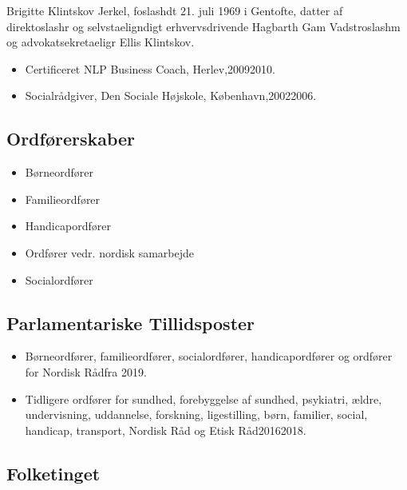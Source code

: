 \documentclass[11pt, a4paper]{awesome-cv}
\begin{document}
\makecvheader[R]
\makelettertitle
\begin{cvletter}
Brigitte Klintskov Jerkel, foslashdt 21. juli 1969 i Gentofte, datter af direktoslashr og selvstaeligndigt erhvervsdrivende Hagbarth Gam Vadstroslashm og advokatsekretaeligr Ellis Klintskov.

\begin{itemize}
\item Certificeret NLP Business Coach, Herlev,20092010.
\item Socialrådgiver, Den Sociale Højskole, København,20022006.
\end{itemize}
\subsection*{Ordførerskaber}
\begin{itemize}
\item Børneordfører
\item Familieordfører
\item Handicapordfører
\item Ordfører vedr. nordisk samarbejde
\item Socialordfører
\end{itemize}
\subsection*{Parlamentariske Tillidsposter}
\begin{itemize}
\item Børneordfører, familieordfører, socialordfører, handicapordfører og ordfører for Nordisk Rådfra 2019.
\item Tidligere ordfører for sundhed, forebyggelse af sundhed, psykiatri, ældre, undervisning, uddannelse, forskning, ligestilling, børn, familier, social, handicap, transport, Nordisk Råd og Etisk Råd20162018.
\end{itemize}
\subsection*{Folketinget}

\end{cvletter}
\end{document}
